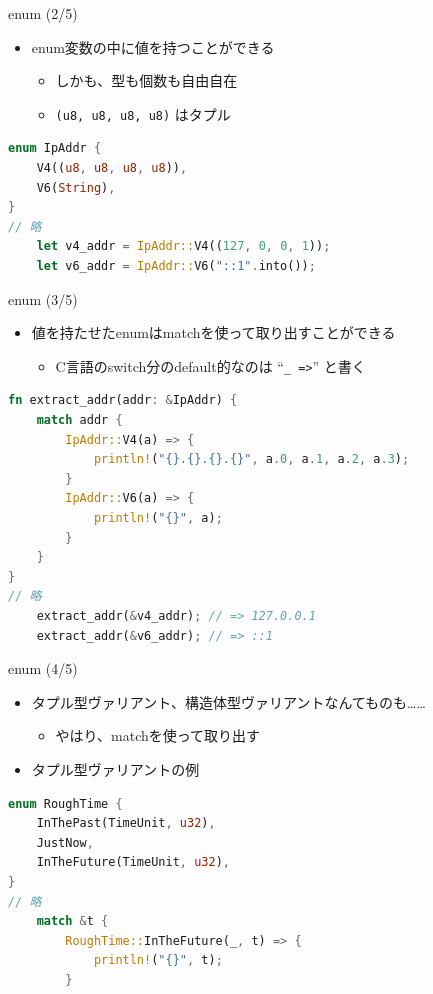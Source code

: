 \documentclass[cjk,dvipdfmx,10pt,compress,fragile%
hyperref={bookmarks=true,bookmarksnumbered=true,bookmarksopen=false,%
colorlinks=false,%
pdftitle={第 134 回 関西 Debian 勉強会},%
pdfauthor={小林},%
pdfsubject={資料},%
}]{beamer}
\begin{document}
\begin{frame}[t,fragile]{enum (2/5)}
 \begin{itemize}
  \item enum変数の中に値を持つことができる
	\begin{itemize}
	 \item しかも、型も個数も自由自在
	 \item \verb|(u8, u8, u8, u8)| はタプル
	\end{itemize}
 \end{itemize}
\begin{lstlisting}[language=Rust,style=boxed,style=colouredRust,basicstyle=\small\tt,lineskip=-2pt]
enum IpAddr {
    V4((u8, u8, u8, u8)),
    V6(String),
}
// 略
    let v4_addr = IpAddr::V4((127, 0, 0, 1));
    let v6_addr = IpAddr::V6("::1".into());\end{lstlisting}
\end{frame}

\begin{frame}[t,fragile]{enum (3/5)}
\begin{itemize}
 \item 値を持たせたenumはmatchを使って取り出すことができる
       \begin{itemize}
	\item C言語のswitch分のdefault的なのは ``\verb|_ =>|'' と書く
       \end{itemize}
\end{itemize}
\begin{lstlisting}[language=Rust,style=boxed,style=colouredRust,basicstyle=\small\tt,lineskip=-2pt]
fn extract_addr(addr: &IpAddr) {
    match addr {
        IpAddr::V4(a) => {
            println!("{}.{}.{}.{}", a.0, a.1, a.2, a.3);
        }
        IpAddr::V6(a) => {
            println!("{}", a);
        }
    }
}
// 略
    extract_addr(&v4_addr); // => 127.0.0.1
    extract_addr(&v6_addr); // => ::1\end{lstlisting}
\end{frame}

\begin{frame}[t,fragile]{enum (4/5)}
 \begin{itemize}
  \item タプル型ヴァリアント、構造体型ヴァリアントなんてものも……
	\begin{itemize}
	 \item やはり、matchを使って取り出す
	\end{itemize}
  \item タプル型ヴァリアントの例
 \end{itemize}
\begin{lstlisting}[language=Rust,style=boxed,style=colouredRust,basicstyle=\small\tt,lineskip=-2pt]
enum RoughTime {
    InThePast(TimeUnit, u32),
    JustNow,
    InTheFuture(TimeUnit, u32),
}
// 略
    match &t {
        RoughTime::InTheFuture(_, t) => {
            println!("{}", t);
        }\end{lstlisting}
\end{frame}
\end{document}
